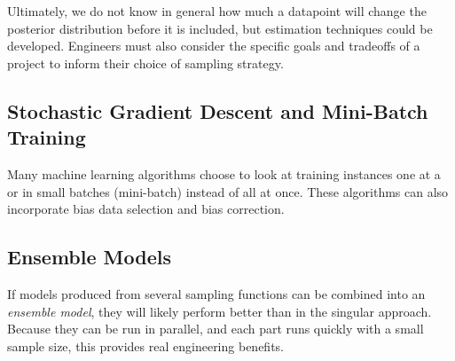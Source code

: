 \documentclass[twoside]{article}
\begin{document}
Ultimately, we do not know in general how much a datapoint will change the posterior distribution before it is included, but estimation techniques could be developed. Engineers must also consider the specific goals and tradeoffs of a project to inform their choice of sampling strategy. 

\subsection{Stochastic Gradient Descent and Mini-Batch Training}

Many machine learning algorithms choose to look at training instances one at a or in small batches (mini-batch) instead of all at once. These algorithms can also incorporate bias data selection and bias correction.

\subsection{Ensemble Models}

If models produced from several sampling functions can be combined into an \textit{ensemble model}, they will likely perform better than in the singular approach. Because they can be run in parallel, and each part runs quickly with a small sample size, this provides real engineering benefits.
\end{document}
